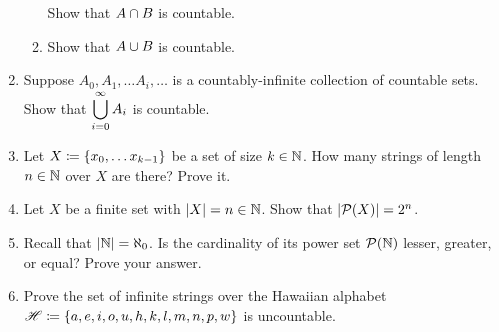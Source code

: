\begin{enumerate}
\begin{enumerate}
                Show that $A \cap B$ is countable.
            \item
                Show that $A \cup B$ is countable.
        \end{enumerate}
    \item
        Suppose $A_0, A_1, \dots A_i, \dots$ is a countably-infinite collection of countable sets.
        Show that $\displaystyle\bigcup_{i = 0}^{\infty}A_i$ is countable.
    \item
        Let $X \defn \set*{x_0, \dots x_{k - 1}}$ be a set of size $k \in \mathbb{N}$.
        How many strings of length $n \in \mathbb{N}$ over $X$ are there?
        Prove it.
    \item
        Let $X$ be a finite set with $\lvert X\rvert = n \in \mathbb{N}$.
        Show that $\cardinality{\power{X}} = 2^n$.
    \item
        Recall that $\lvert\mathbb{N}\rvert = \aleph_0$.
        Is the cardinality of its power set $\power{\N}$ lesser, greater, or equal?
        Prove your answer.
    \item
        Prove the set of infinite strings over the Hawaiian alphabet
        $\mathscr{H} \defn \set*{a, e, i, o, u, h, k, l, m, n, p, w}$ is uncountable.
\end{enumerate}

